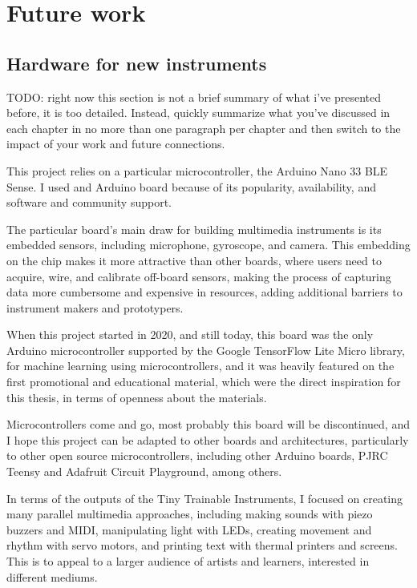\section{Future work}

\subsection{Hardware for new instruments}

TODO: right now this section is not a brief summary of what i’ve presented before, it is too detailed. Instead, quickly summarize what you've discussed in each chapter in no more than one paragraph per chapter and then switch to the impact of your work and future connections.

This project relies on a particular microcontroller, the Arduino Nano 33 BLE Sense. I used and Arduino board because of its popularity, availability, and software and community support.

The particular board's main draw for building multimedia instruments is its embedded sensors, including microphone, gyroscope, and camera. This embedding on the chip makes it more attractive than other boards, where users need to acquire, wire, and calibrate off-board sensors, making the process of capturing data more cumbersome and expensive in resources, adding additional barriers to instrument makers and prototypers. 

When this project started in 2020, and still today, this board was the only Arduino microcontroller supported by the Google TensorFlow Lite Micro library, for machine learning using microcontrollers, and it was heavily featured on the first promotional and educational material, which were the direct inspiration for this thesis, in terms of openness about the materials.

Microcontrollers come and go, most probably this board will be discontinued, and I hope this project can be adapted to other boards and architectures, particularly to other open source microcontrollers, including other Arduino boards, PJRC Teensy and Adafruit Circuit Playground, among others.

In terms of the outputs of the Tiny Trainable Instruments, I focused on creating many parallel multimedia approaches, including making sounds with piezo buzzers and MIDI, manipulating light with LEDs, creating movement and rhythm with servo motors, and printing text with thermal printers and screens. This is to appeal to a larger audience of artists and learners, interested in different mediums.

